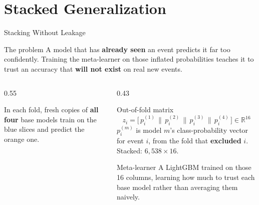\section{Stacked Generalization}

\begin{frame}[shrink]{Stacking Without Leakage}
  \begin{alertblock}{The problem}
    A model that has \textbf{already seen} an event predicts it far too
    confidently. Training the meta-learner on those inflated probabilities
    teaches it to trust an accuracy that \textbf{will not exist} on real new
    events.
  \end{alertblock}

  \begin{columns}[T]
    \begin{column}{0.55\textwidth}
      \centering

      \vspace{2mm}
      {\scriptsize In each fold, fresh copies of \textbf{all four} base models
      train on the blue slices and predict the orange one.}
    \end{column}
    \begin{column}{0.43\textwidth}
      \begin{exampleblock}{Out-of-fold matrix}
        \small\vspace{-2mm}
        \[ z_i = \big[\, p^{(1)}_i \,\|\, p^{(2)}_i \,\|\, p^{(3)}_i
                        \,\|\, p^{(4)}_i \,\big] \in \mathbb{R}^{16} \]
        \small $p^{(m)}_i$ is model $m$'s class-probability vector for event $i$,
        from the fold that \textbf{excluded} $i$. Stacked: $6{,}538 \times 16$.
      \end{exampleblock}
      \begin{block}{Meta-learner}
        \small A LightGBM trained on those 16 columns, learning how much to trust
        each base model rather than averaging them naively.
      \end{block}
    \end{column}
  \end{columns}
\end{frame}

